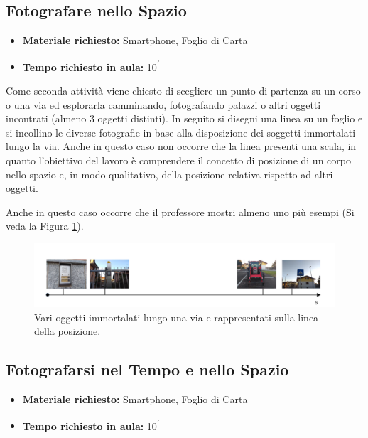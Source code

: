 \documentclass{report} \usepackage[T1]{fontenc} \usepackage[italian]{babel}
\begin{document}
\subsection{Fotografare nello Spazio}

\begin{itemize}
\item \textbf{Materiale richiesto:} Smartphone, Foglio di Carta
\item \textbf{Tempo richiesto in aula:} 10\textsuperscript{$\prime$}
\end{itemize}

Come seconda attività viene chiesto di scegliere un punto di partenza su un
corso o una via ed esplorarla camminando, fotografando palazzi o altri oggetti
incontrati (almeno 3 oggetti distinti). In seguito si disegni una linea su un
foglio e si incollino le diverse fotografie in base alla disposizione dei
soggetti immortalati lungo la via. Anche in questo caso non occorre che la
linea presenti una scala, in quanto l’obiettivo del lavoro è comprendere il
concetto di posizione di un corpo nello spazio e, in modo qualitativo, della
posizione relativa rispetto ad altri oggetti.

Anche in questo caso occorre che il professore mostri almeno uno più esempi
(Si veda la Figura \ref{fig:asse_s}).

\begin{figure}[H]
\centering
  \includegraphics[width=\textwidth]{asse_s}
  \caption{Vari oggetti immortalati lungo una via e rappresentati
           sulla linea della posizione.}
  \label{fig:asse_s}
\end{figure}

\subsection{Fotografarsi nel Tempo e nello Spazio}

\begin{itemize}
\item \textbf{Materiale richiesto:} Smartphone, Foglio di Carta
\item \textbf{Tempo richiesto in aula:} 10\textsuperscript{$\prime$}
\end{itemize}
\end{document}

